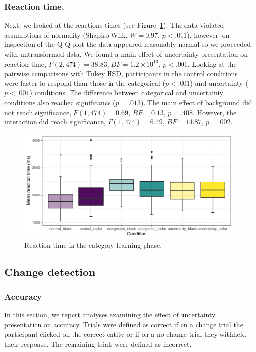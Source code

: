 \documentclass[doc, a4paper, apacite]{apa6}
\begin{document}
\subsubsection{Reaction time.}
Next, we looked at the reactions times (see Figure~\ref{fig:DSTL08CLboxplotRT}).
The data violated assumptions of normality (Shapiro-Wilk, $W=0.97$, $p<.001$), however, on inspection of the Q-Q plot the data appeared reasonably normal so we proceeded with untransformed data. 
We found a main effect of uncertainty presentation on reaction time, $F(2, 474)=38.83$, $BF=1.2\times 10^{13}$, $p<.001$. 
Looking at the pairwise comparisons with Tukey HSD, participants in the control conditions were faster to respond than those in the categorical ($p<.001$) and uncertainty ($p<.001$) conditions. 
The difference between categorical and uncertainty conditions also reached significance ($p=.013$).
The main effect of background did not reach significance, $F(1, 474)=0.69$,  $BF=0.13$, $p=.408$. 
However, the interaction did reach significance, $F(1, 474)=6.49$, $BF=14.87$, $p=.002$.

\begin{figure}[h!]
	\centering
	\includegraphics[width=\textwidth]{images/DSTL08CLboxplotRT.pdf}	
	\caption{Reaction time in the category learning phase.}
	\label{fig:DSTL08CLboxplotRT}
\end{figure}

\subsection{Change detection}
\subsubsection{Accuracy}
In this section, we report analyses examining the effect of uncertainty presentation on accuracy. 
Trials were defined as correct if on a change trial the participant clicked on the correct entity or if on a no change trial they withheld their response. 
The remaining trials were defined as incorrect. 
\end{document}
